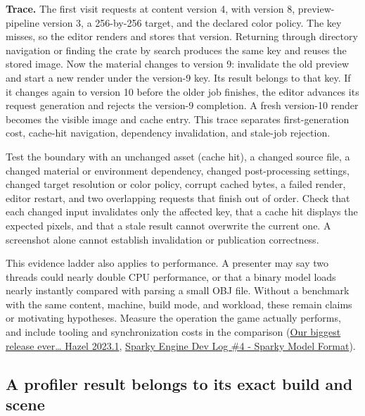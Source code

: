 \textbf{Trace.} The first visit requests  at content version 4, with  version 8, preview-pipeline version 3, a 256-by-256 target, and the declared color policy. The key misses, so the editor renders and stores that version. Returning through directory navigation or finding the crate by search produces the same key and reuses the stored image. Now the material changes to version 9: invalidate the old preview and start a new render under the version-9 key. Its result belongs to that key. If it changes again to version 10 before the older job finishes, the editor advances its request generation and rejects the version-9 completion. A fresh version-10 render becomes the visible image and cache entry. This trace separates first-generation cost, cache-hit navigation, dependency invalidation, and stale-job rejection.

Test the boundary with an unchanged asset (cache hit), a changed source file, a changed material or environment dependency, changed post-processing settings, changed target resolution or color policy, corrupt cached bytes, a failed render, editor restart, and two overlapping requests that finish out of order. Check that each changed input invalidates only the affected key, that a cache hit displays the expected pixels, and that a stale result cannot overwrite the current one. A screenshot alone cannot establish invalidation or publication correctness.

This evidence ladder also applies to performance. A presenter may say two threads could nearly double CPU performance, or that a binary model loads nearly instantly compared with parsing a small OBJ file. Without a benchmark with the same content, machine, build mode, and workload, these remain claims or motivating hypotheses. Measure the operation the game actually performs, and include tooling and synchronization costs in the comparison (\href{https://www.youtube.com/watch?v=L_XLGmG2Ct8&t=1m12s}{Our biggest release ever\ldots{} Hazel 2023.1}, \href{https://www.youtube.com/watch?v=EUy8G3uMitI&t=4m30s}{Sparky Engine Dev Log \#4 - Sparky Model Format}).

\subsection{A profiler result belongs to its exact build and scene}\label{06-engine-ii-ch041-a-profiler-result-belongs-to-its-exact-build-and-scene}

